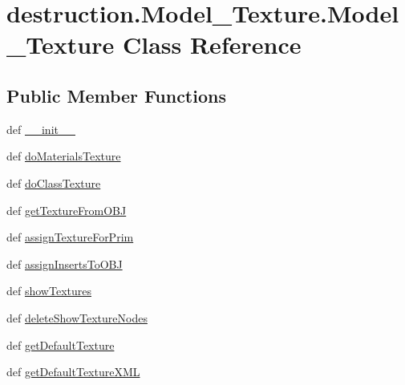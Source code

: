 \hypertarget{classdestruction_1_1_model___texture_1_1_model___texture}{\section{destruction.\-Model\-\_\-\-Texture.\-Model\-\_\-\-Texture Class Reference}
\label{classdestruction_1_1_model___texture_1_1_model___texture}
}
\subsection*{Public Member Functions}
\begin{DoxyCompactItemize}
\item 
def \hyperlink{classdestruction_1_1_model___texture_1_1_model___texture_a96e6b23716434403746f65e496dce6f9}{\-\_\-\-\_\-init\-\_\-\-\_\-}
\item 
def \hyperlink{classdestruction_1_1_model___texture_1_1_model___texture_a081feec7295bb513c92878af049b1494}{do\-Materials\-Texture}
\item 
def \hyperlink{classdestruction_1_1_model___texture_1_1_model___texture_ad7e805c50678f58f8d94ad184e8f4467}{do\-Class\-Texture}
\item 
def \hyperlink{classdestruction_1_1_model___texture_1_1_model___texture_a682b36022d313633d47b2685d4f14888}{get\-Texture\-From\-O\-B\-J}
\item 
def \hyperlink{classdestruction_1_1_model___texture_1_1_model___texture_ae108c922815bd5abb1986468696a75ad}{assign\-Texture\-For\-Prim}
\item 
def \hyperlink{classdestruction_1_1_model___texture_1_1_model___texture_a20a7342a69d4358e95ec0562968373ed}{assign\-Inserts\-To\-O\-B\-J}
\item 
def \hyperlink{classdestruction_1_1_model___texture_1_1_model___texture_a6c5b681a3c627e85b84601a61fd9eda1}{show\-Textures}
\item 
def \hyperlink{classdestruction_1_1_model___texture_1_1_model___texture_a7534ab4c539536f0e1bf336332480028}{delete\-Show\-Texture\-Nodes}
\item 
def \hyperlink{classdestruction_1_1_model___texture_1_1_model___texture_a9b47c4e9f24d8b5a87b364e56ebacbc2}{get\-Default\-Texture}
\item 
def \hyperlink{classdestruction_1_1_model___texture_1_1_model___texture_a9c395ad4a976e621206ffc01c892f93b}{get\-Default\-Texture\-X\-M\-L}
\end{DoxyCompactItemize}
